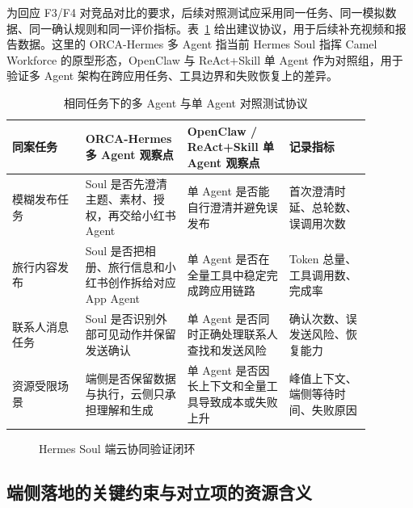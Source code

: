 为回应 F3/F4 对竞品对比的要求，后续对照测试应采用同一任务、同一模拟数据、同一确认规则和同一评价指标。表~\ref{tab:rt4-compare-protocol} 给出建议协议，用于后续补充视频和报告数据。这里的 ORCA-Hermes 多 Agent 指当前 Hermes Soul 指挥 Camel Workforce 的原型形态，OpenClaw 与 ReAct+Skill 单 Agent 作为对照组，用于验证多 Agent 架构在跨应用任务、工具边界和失败恢复上的差异。

\begin{table}[h]
\centering
\begin{tabular}{p{0.18\linewidth}p{0.25\linewidth}p{0.25\linewidth}p{0.20\linewidth}}
\hline
\textbf{同案任务} & \textbf{ORCA-Hermes 多 Agent 观察点} & \textbf{OpenClaw / ReAct+Skill 单 Agent 观察点} & \textbf{记录指标} \\
\hline
模糊发布任务 & Soul 是否先澄清主题、素材、授权，再交给小红书 Agent & 单 Agent 是否能自行澄清并避免误发布 & 首次澄清时延、总轮数、误调用次数 \\
旅行内容发布 & Soul 是否把相册、旅行信息和小红书创作拆给对应 App Agent & 单 Agent 是否在全量工具中稳定完成跨应用链路 & Token 总量、工具调用数、完成率 \\
联系人消息任务 & Soul 是否识别外部可见动作并保留发送确认 & 单 Agent 是否同时正确处理联系人查找和发送风险 & 确认次数、误发送风险、恢复能力 \\
资源受限场景 & 端侧是否保留数据与执行，云侧只承担理解和生成 & 单 Agent 是否因长上下文和全量工具导致成本或失败上升 & 峰值上下文、端侧等待时间、失败原因 \\
\hline
\end{tabular}
\caption{相同任务下的多 Agent 与单 Agent 对照测试协议}
\label{tab:rt4-compare-protocol}
\end{table}

\begin{figure}[h]
\centering
{}
\caption{Hermes Soul 端云协同验证闭环}
\label{fig:rt4-edge-cloud-flow}
\end{figure}

\subsection{端侧落地的关键约束与对立项的资源含义}

